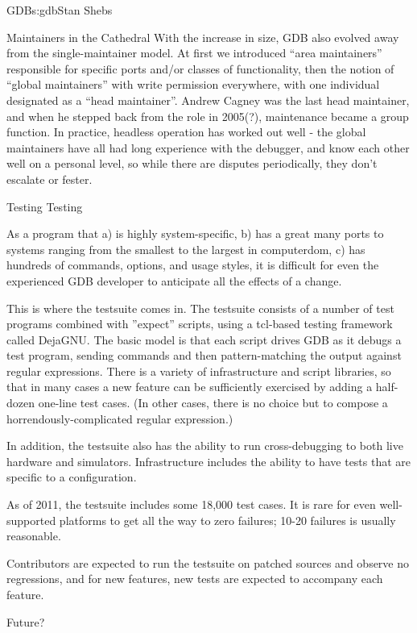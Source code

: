 \begin{aosachapter}{GDB}{s:gdb}{Stan Shebs}
\begin{aosasect1}{Maintainers in the Cathedral}
With the increase in size, GDB also evolved away from the
single-maintainer model.  At first we introduced ``area maintainers''
responsible for specific ports and/or classes of functionality, then
the notion of ``global maintainers'' with write permission everywhere,
with one individual designated as a ``head maintainer''.  Andrew
Cagney was the last head maintainer, and when he stepped back from the
role in 2005(?), maintenance became a group function.  In practice,
headless operation has worked out well - the global maintainers have
all had long experience with the debugger, and know each other well on
a personal level, so while there are disputes periodically, they
don't escalate or fester.

\end{aosasect1}

\begin{aosasect1}{Testing Testing}

As a program that a) is highly system-specific, b) has a great many
ports to systems ranging from the smallest to the largest in computerdom,
c) has hundreds of commands, options, and usage styles, it is difficult
for even the experienced GDB developer to anticipate all the effects of
a change.

This is where the testsuite comes in.  The testsuite consists of a
number of test programs combined with ''expect'' scripts, using a
tcl-based testing framework called DejaGNU.  The basic model is that
each script drives GDB as it debugs a test program, sending commands and
then pattern-matching the output against regular expressions.  There
is a variety of infrastructure and script libraries, so that in many
cases a new feature can be sufficiently exercised by adding a
half-dozen one-line test cases.  (In other cases, there is no choice
but to compose a horrendously-complicated regular expression.)

In addition, the testsuite also has the ability to run cross-debugging
to both live hardware and simulators.  Infrastructure includes the
ability to have tests that are specific to a configuration.

As of 2011, the testsuite includes some 18,000 test cases.  It is rare
for even well-supported platforms to get all the way to zero failures;
10-20 failures is usually reasonable.

Contributors are expected to run the testsuite on patched sources
and observe no regressions, and for new features, new tests are
expected to accompany each feature.

\end{aosasect1}

\begin{aosasect1}{Future?}

\end{aosasect1}

\end{aosachapter}
